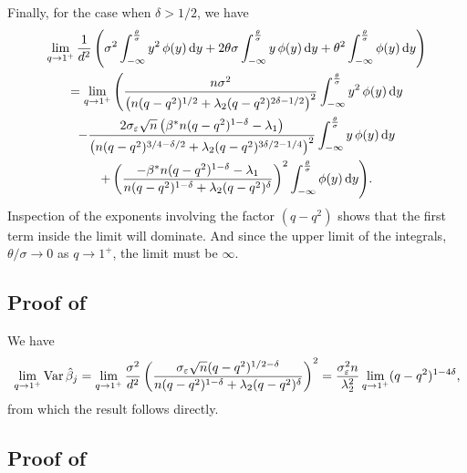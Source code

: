 Finally, for the case when \(\delta > 1/2\), we have
\begin{multline}
  \label{eq:var-deltagthalf-integral}
  \lim_{q \rightarrow 1^+} \frac{1}{d^2} \left(\sigma^2 \int_{-\infty}^\frac{\theta}{\sigma} y^2 \operatorname{\phi}(y) \mathop{}\!\mathrm{d} y + 2 \theta \sigma \int_{-\infty}^\frac{\theta}{\sigma} y \operatorname{\phi}(y) \mathop{}\!\mathrm{d} y + \theta^2 \int_{-\infty}^\frac{\theta}{\sigma} \operatorname{\phi}(y) \mathop{}\!\mathrm{d} y\right) \\
  = \lim_{q \rightarrow 1^+} \Bigg( \frac{n \sigma^2}{ \left(n (q-q^2)^{1/2} + \lambda_2(q-q^2)^{2\delta - 1/2}\right)^2} \int_{-\infty}^\frac{\theta}{\sigma} y^2 \operatorname{\phi}(y) \mathop{}\!\mathrm{d} y
  \\- \frac{2\sigma_\varepsilon \sqrt{n}\left(\beta^* n (q- q^2)^{1 - \delta} - \lambda_1\right)}{\left(n(q-q^2)^{3/4 - \delta/2} + \lambda_2(q-q^2)^{3\delta / 2 - 1/4}\right)^2} \int_{-\infty}^\frac{\theta}{\sigma} y \operatorname{\phi}(y) \mathop{}\!\mathrm{d} y \\
  + \left(\frac{-\beta^*n(q-q^2)^{1-\delta} - \lambda_1}{n(q-q^2)^{1-\delta} + \lambda_2(q-q^2)^\delta}\right)^2 \int_{-\infty}^\frac{\theta}{\sigma} \operatorname{\phi}(y) \mathop{}\!\mathrm{d} y\Bigg).
\end{multline}
Inspection of the exponents involving the factor \((q - q^2)\) shows that the first term inside the limit will dominate. And since the upper limit of the integrals, \(\theta/\sigma \rightarrow  0\)  as \(q \rightarrow 1^+\), the limit must be \(\infty\).

\subsection{Proof of }

We have
\begin{equation*}
  \lim_{q\rightarrow 1^+}\operatorname{Var} \hat{\beta}_j = \lim_{q \rightarrow 1^+}\frac{\sigma^2}{d^2} \left(\frac{\sigma_\varepsilon \sqrt{n} (q - q^2)^{1/2 - \delta}}{n (q-q^2)^{1 - \delta} + \lambda_2 (q-q^2)^\delta}\right)^2
  = \frac{\sigma_\varepsilon^2 n}{\lambda_2^2} \lim_{q \rightarrow 1^+}(q-q^2)^{1 - 4\delta},
\end{equation*}
from which the result follows directly.

\subsection{Proof of }

